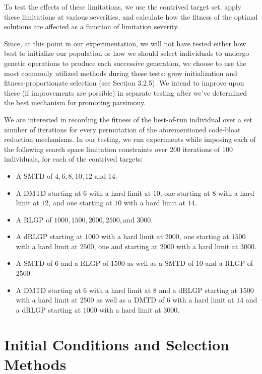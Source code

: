 \documentclass[12pt]{report} 	%
\numberwithin{figure}{chapter}
\numberwithin{table}{chapter}
\numberwithin{equation}{chapter}
\begin{document}
\begin{flushleft}
To test the effects of these limitations, we use the contrived target set, apply these limitations at various severities, and calculate how the fitness of the optimal solutions are affected as a function of limitation severity. 

Since, at this point in our experimentation, we will not have tested either how best to initialize our population or how we should select individuals to undergo genetic operations to produce each successive generation, we choose to use the most commonly utilized methods during these tests: grow initialization and fitness-proportionate selection (see Section 3.2.5). We intend to improve upon these (if improvements are possible) in separate testing after we've determined the best mechanism for promoting parsimony. 

We are interested in recording the fitness of the best-of-run individual over a set number of iterations for every permutation of the aforementioned code-bloat reduction mechanisms. In our testing, we run experiments while imposing each of the following search space limitation constraints over $200$ iterations of $100$ individuals, for each of the contrived targets:
\begin{itemize}
\item A SMTD of $4,6,8, 10, 12 \text{ and }14$.
\item A DMTD starting at $6$ with a hard limit at $10$, one starting at $8$ with a hard limit at $12$, and one starting at $10$ with a hard limit at $14$.
\item A RLGP of $1000, 1500, 2000, 2500, \text{and } 3000$.
\item A dRLGP starting at $1000$ with a hard limit at $2000$, one starting at $1500$ with a hard limit at $2500$, one and starting at $2000$ with a hard limit at $3000$.
\item A SMTD of $6$ and a RLGP of $1500$ as well as a SMTD of $10$ and a RLGP of $2500$.
\item A DMTD starting at $6$ with a hard limit at $8$ and a dRLGP starting at $1500$ with a hard limit at $2500$ as well as a DMTD of $6$ with a hard limit at $14$ and a dRLGP starting at  $1000$ with a hard limit at $3000$.
\end{itemize}

\vspace{12pt}\section{Initial Conditions and Selection Methods}


\end{flushleft}
\end{document}
